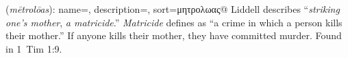 \item[Mother-murderer,]

(\textit{mētrolōas}):
{
    name=,
    description={},
    sort=μητρολωας@
}
Liddell describes ``\emph{striking one's mother}, \emph{a matricide}.'' \emph{Matricide} defines as ``a crime in which a person kills their mother.'' If anyone kills their mother, they have committed murder.
Found in 1~Tim 1:9.
